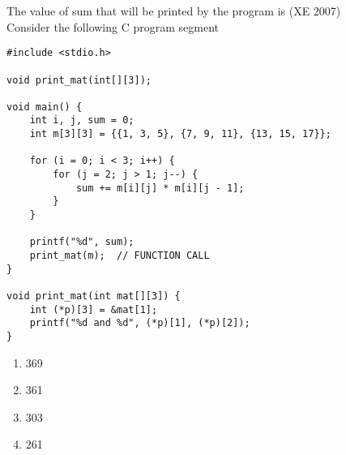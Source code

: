 \item The value of sum that will be printed by the program is
\hfill{(XE 2007)}\\
Consider the following C program segment\\ 
\begin{verbatim}
#include <stdio.h>

void print_mat(int[][3]);

void main() {
    int i, j, sum = 0;
    int m[3][3] = {{1, 3, 5}, {7, 9, 11}, {13, 15, 17}};
    
    for (i = 0; i < 3; i++) {
        for (j = 2; j > 1; j--) {
            sum += m[i][j] * m[i][j - 1];
        }
    }
    
    printf("%d", sum);
    print_mat(m);  // FUNCTION CALL
}

void print_mat(int mat[][3]) {
    int (*p)[3] = &mat[1];
    printf("%d and %d", (*p)[1], (*p)[2]);
}
\end{verbatim}
\begin{multicols}{4}
\begin{enumerate}
\item 369
\item 361
\item 303
\item 261
\end{enumerate} 
\end{multicols}



